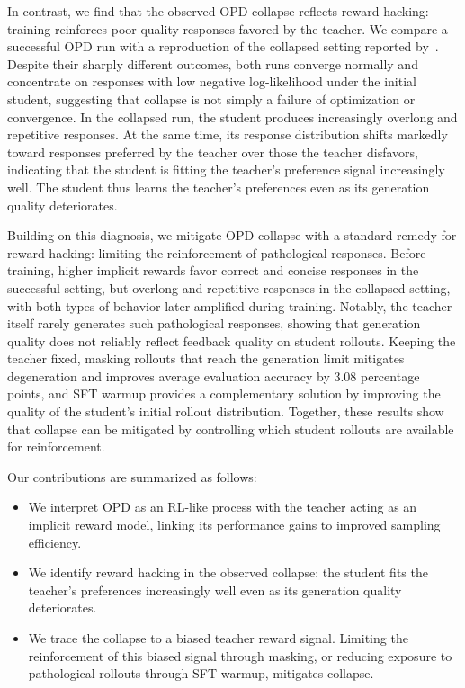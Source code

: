 In contrast, we find that the observed OPD collapse reflects reward hacking: training reinforces poor-quality responses favored by the teacher.
We compare a successful OPD run with a reproduction of the collapsed setting reported by~\citet{li2026rethinkingopd}.
Despite their sharply different outcomes, both runs converge normally and concentrate on responses with low negative log-likelihood under the initial student, suggesting that collapse is not simply a failure of optimization or convergence.
In the collapsed run, the student produces increasingly overlong and repetitive responses.
At the same time, its response distribution shifts markedly toward responses preferred by the teacher over those the teacher disfavors, indicating that the student is fitting the teacher's preference signal increasingly well.
The student thus learns the teacher's preferences even as its generation quality deteriorates.

Building on this diagnosis, we mitigate OPD collapse with a standard remedy for reward hacking: limiting the reinforcement of pathological responses.
Before training, higher implicit rewards favor correct and concise responses in the successful setting, but overlong and repetitive responses in the collapsed setting, with both types of behavior later amplified during training.
Notably, the teacher itself rarely generates such pathological responses, showing that generation quality does not reliably reflect feedback quality on student rollouts.
Keeping the teacher fixed, masking rollouts that reach the generation limit mitigates degeneration and improves average evaluation accuracy by 3.08 percentage points, 
and SFT warmup provides a complementary solution by improving the quality of the student's initial rollout distribution.
Together, these results show that collapse can be mitigated by controlling which student rollouts are available for reinforcement.


Our contributions are summarized as follows:
%
\begingroup
\setlength{\topsep}{4pt}
\setlength{\partopsep}{0pt}
\setlength{\itemsep}{4pt}
\setlength{\parsep}{0pt}
\begin{itemize}
    \item We interpret OPD as an RL-like process with the teacher acting as an implicit reward model, linking its performance gains to improved sampling efficiency.
    \item We identify reward hacking in the observed collapse: the student fits the teacher's preferences increasingly well even as its generation quality deteriorates.
    \item We trace the collapse to a biased teacher reward signal. Limiting the reinforcement of this biased signal through masking, or reducing exposure to pathological rollouts through SFT warmup, mitigates collapse.
\end{itemize}
\endgroup
